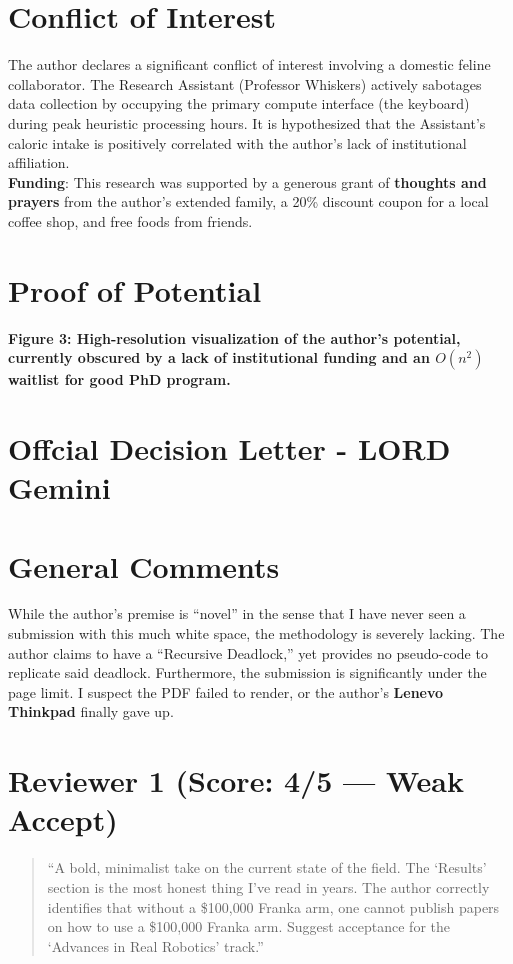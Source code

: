 \documentclass[letterpaper]{article}
\begin{document}
\section{Conflict of Interest}
The author declares a significant conflict of interest involving a domestic feline collaborator. The Research Assistant (Professor Whiskers) actively sabotages data collection by occupying the primary compute interface (the keyboard) during peak heuristic processing hours. It is hypothesized that the Assistant's caloric intake is positively correlated with the author's lack of institutional affiliation. \\


\noindent \textbf{Funding}: This research was supported by a generous grant of \textbf{thoughts and prayers} from the author's extended family, a 20\% discount coupon for a local coffee shop, and free foods from friends.

\section{Proof of Potential}
\begin{center}
    \framebox[2in]{\rule{0pt}{2in}}
\end{center}

\noindent \textbf{Figure 3: High-resolution visualization of the author's potential, currently obscured by a lack of institutional funding and an $O(n^2)$ waitlist for good PhD program.}


\newpage
\appendix

\section{Offcial Decision Letter - LORD Gemini}

\section*{General Comments}
While the author’s premise is ``novel'' in the sense that I have never seen a submission with this much white space, the methodology is severely lacking. The author claims to have a ``Recursive Deadlock,'' yet provides no pseudo-code to replicate said deadlock. Furthermore, the submission is significantly under the page limit. I suspect the PDF failed to render, or the author’s \textbf{Lenevo Thinkpad} finally gave up.

\section*{Reviewer 1 (Score: 4/5 --- Weak Accept)}
\begin{quote}
``A bold, minimalist take on the current state of the field. The `Results' section is the most honest thing I’ve read in years. The author correctly identifies that without a \$100{,}000 Franka arm, one cannot publish papers on how to use a \$100{,}000 Franka arm. Suggest acceptance for the `Advances in Real Robotics' track.''
\end{quote}
\end{document}
